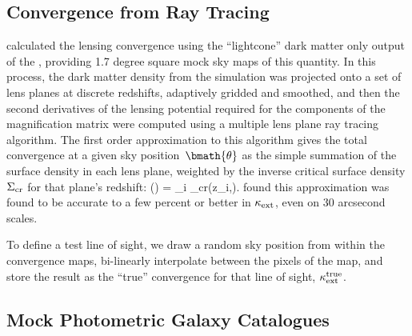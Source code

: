 \documentclass[useAMS,usenatbib,a4paper]{mn2e}
\begin{document}

\subsection{Convergence from Ray Tracing}
\label{sec:MS:raytracing}

\citet{HilbertEtal2009} calculated the lensing convergence using the
``lightcone'' dark matter only  output of the \MS, providing 1.7 degree
square  mock sky maps of this quantity. In this process, the dark matter
density from the simulation was projected onto a set of lens planes at
discrete redshifts, adaptively gridded and smoothed, and then the second
derivatives of the  lensing potential required for the components of the
magnification matrix were computed using a multiple lens plane ray tracing
algorithm. The first order approximation to this algorithm \citep[equation 17
of][]{HilbertEtal2009} gives the total convergence at a given sky
position~$\bmath{\theta}$ as the simple summation of the surface density in
each lens plane, weighted by the inverse critical surface density $\Sigma_{\rm
cr}$ for that plane's redshift:
\be
\kappax(\bmath{\theta}) = \sum_i 
                                     {\Sigma_{\rm cr}(z_i,\zs)}.
\ee
\citet{HilbertEtal2009} found this approximation was found to be accurate to a few percent or better
in $\kappa_{\rm ext}$, even on 30 arcsecond scales.

To define a test line of sight, we draw a random sky position from
within the convergence maps, bi-linearly interpolate between the pixels
of the map, and store the result as the ``true'' convergence for that
line of sight, $\kappa_{\rm ext}^{\rm true}$. 



\subsection{Mock Photometric Galaxy Catalogues}
\label{sec:MS:mocks}
\end{document}
